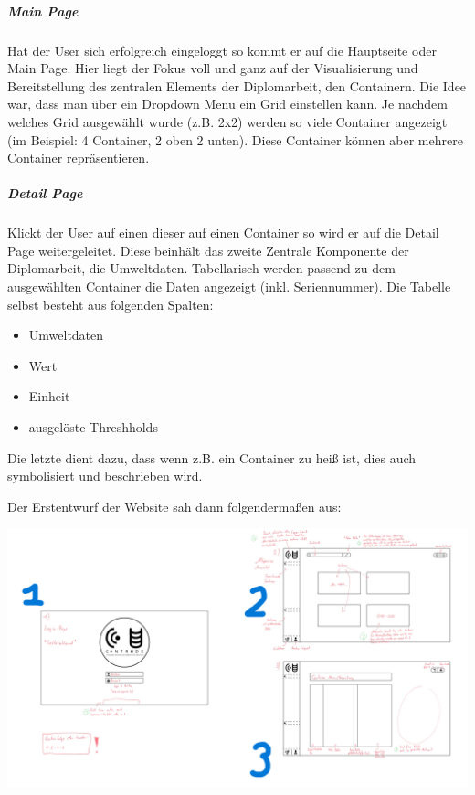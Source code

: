 \documentclass[
    headings=optiontotocandhead,%
    twoside,
    numbers=noenddot,%
    12pt, %
    titlepage, %
    parskip=full, %
    listof=leveldown, 
    numbers=noenddot, %
    a4paper,DIV=14,
    BCOR=15mm,
]{scrbook}
\let\origfigure=\figure
\let\endorigfigure=\endfigure
\renewenvironment{figure}[1][]{%
   \origfigure[H]
}{%
   \endorigfigure
}
\providecommand{\tightlist}{%
  \setlength{\itemsep}{0pt}\setlength{\parskip}{0pt}}
\begin{document}
\hypertarget{main-page}{%
\subparagraph{Main Page}\label{main-page}}

Hat der User sich erfolgreich eingeloggt so kommt er auf die Hauptseite
oder Main Page. Hier liegt der Fokus voll und ganz auf der
Visualisierung und Bereitstellung des zentralen Elements der
Diplomarbeit, den Containern. Die Idee war, dass man über ein Dropdown
Menu ein Grid einstellen kann. Je nachdem welches Grid ausgewählt wurde
(z.B. 2x2) werden so viele Container angezeigt (im Beispiel: 4
Container, 2 oben 2 unten). Diese Container können aber mehrere
Container repräsentieren.

\hypertarget{detail-page}{%
\subparagraph{Detail Page}\label{detail-page}}

Klickt der User auf einen dieser auf einen Container so wird er auf die
Detail Page weitergeleitet. Diese beinhält das zweite Zentrale
Komponente der Diplomarbeit, die Umweltdaten. Tabellarisch werden
passend zu dem ausgewählten Container die Daten angezeigt (inkl.
Seriennummer). Die Tabelle selbst besteht aus folgenden Spalten:

\begin{itemize}
\tightlist
\item
  Umweltdaten
\item
  Wert
\item
  Einheit
\item
  ausgelöste Threshholds
\end{itemize}

Die letzte dient dazu, dass wenn z.B. ein Container zu heiß ist, dies
auch symbolisiert und beschrieben wird.

Der Erstentwurf der Website sah dann folgendermaßen aus:

\begin{figure}
\centering
\includegraphics{img/Gekle/DesignV1.png}
\caption{Erste Version des Website Designs}
\end{figure}
\end{document}
